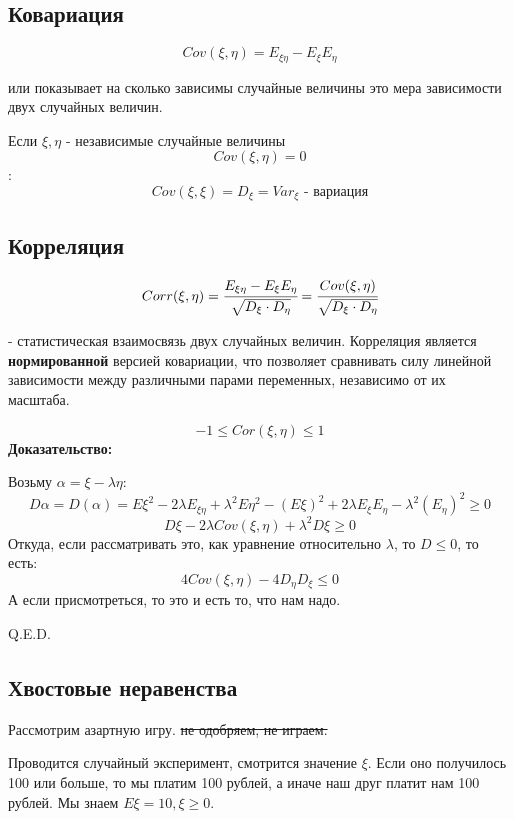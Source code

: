 \subsection{Ковариация}

$$Cov(\xi,\eta) =E_{\xi \eta} -  E_{\xi}E_{\eta}$$

 или  показывает на сколько зависимы случайные величины это мера зависимости двух случайных величин.

Если $\xi, \eta$ - независимые случайные величины
$$Cov(\xi,\eta) = 0$$:
$$Cov(\xi,\xi) = D_\xi = Var_\xi \text{ - вариация}$$

\subsection{Корреляция}

$$Corr(\xi,\eta) =\cfrac{E_{\xi \eta} -  E_{\xi}E_{\eta}}{\sqrt{D_{\xi}\cdot D_{\eta}}} = \cfrac{Cov(\xi,\eta)}{\sqrt{D_{\xi}\cdot D_{\eta}}}$$

 - статистическая взаимосвязь двух случайных величин. Корреляция является \textbf{нормированной} версией ковариации, что позволяет сравнивать силу линейной зависимости между различными парами переменных, независимо от их масштаба.

$$-1\leq Cor(\xi,\eta)\leq 1$$
\textbf{Доказательство:}

Возьму $\alpha = \xi - \lambda \eta$:
$$D\alpha = D(\alpha) = E\xi^2 - 2\lambda E_{\xi\eta} + \lambda^2E \eta^2-(E\xi)^2 + 2\lambda E_{\xi}E_{\eta}-\lambda^2(E_\eta)^2\geq 0$$
$$D\xi - 2\lambda Cov(\xi,\eta) + \lambda^2 D\xi \geq 0$$
Откуда, если рассматривать это, как уравнение относительно $\lambda$, то $D\leq 0 $, то есть:
$$4Cov(\xi,\eta) - 4 D_{\eta}D_{\xi}\leq 0$$
А если присмотреться, то это и есть то, что нам надо.

\hfill Q.E.D.

\subsection{Хвостовые неравенства}

Рассмотрим азартную игру. \sout{не одобряем, не играем.} 

Проводится случайный эксперимент, смотрится значение $\xi$. Если оно получилось 100 или больше, то мы платим 100 рублей, а иначе наш друг платит нам 100 рублей. Мы знаем $ E\xi = 10, \xi\geq 0$.

